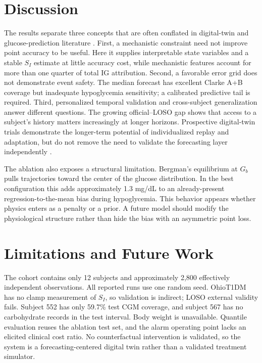 \documentclass[journal]{IEEEtran}
\begin{document}
\section{Discussion}

The results separate three concepts that are often conflated in digital-twin and glucose-prediction literature \cite{ref2}. First, a mechanistic constraint need not improve point accuracy to be useful. Here it supplies interpretable state variables and a stable $S_I$ estimate at little accuracy cost, while mechanistic features account for more than one quarter of total IG attribution. Second, a favorable error grid does not demonstrate event safety. The median forecast has excellent Clarke A+B coverage but inadequate hypoglycemia sensitivity; a calibrated predictive tail is required. Third, personalized temporal validation and cross-subject generalization answer different questions. The growing official--LOSO gap shows that access to a subject's history matters increasingly at longer horizons. Prospective digital-twin trials demonstrate the longer-term potential of individualized replay and adaptation, but do not remove the need to validate the forecasting layer independently \cite{ref18}.

The ablation also exposes a structural limitation. Bergman's equilibrium at $G_b$ pulls trajectories toward the center of the glucose distribution. In the best configuration this adds approximately 1.3 mg/dL to an already-present regression-to-the-mean bias during hypoglycemia. This behavior appears whether physics enters as a penalty or a prior. A future model should modify the physiological structure rather than hide the bias with an asymmetric point loss.

\section{Limitations and Future Work}

The cohort contains only 12 subjects and approximately 2,800 effectively independent observations. All reported runs use one random seed. OhioT1DM has no clamp measurement of $S_I$, so validation is indirect; LOSO external validity fails. Subject 552 has only 59.7\% test CGM coverage, and subject 567 has no carbohydrate records in the test interval. Body weight is unavailable. Quantile evaluation reuses the ablation test set, and the alarm operating point lacks an elicited clinical cost ratio. No counterfactual intervention is validated, so the system is a forecasting-centered digital twin rather than a validated treatment simulator.
\end{document}
